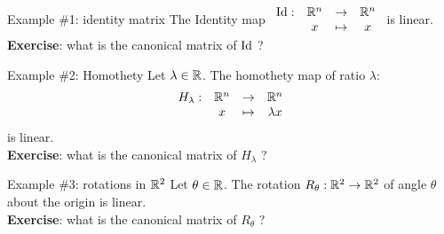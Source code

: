 \documentclass{beamer}
\begin{document}
\begin{frame}[t]{Example \#1: identity matrix}
		The Identity map \quad $\displaystyle
			\begin{array}{cccc}
				{{\rm Id}}: & \mathbb{R}^n & \to & \mathbb{R}^n \\
				   & x & \mapsto & x
			\end{array}
			$
			\quad is linear.
			\\
			\vspace{0.3cm}
			\textbf{Exercise}: what is the canonical matrix of ${{\rm Id}}$ ?
\end{frame}
\begin{frame}[t]{Example \#2: Homothety}
	Let $\lambda \in \mathbb{R}$.
		The homothety map of ratio $\lambda$: 
		 $$
			\begin{array}{cccc}
				H_{\lambda}: & \mathbb{R}^n & \to & \mathbb{R}^n \\
				   & x & \mapsto & \lambda x
			\end{array}
			$$
			is linear.
			\\
			\vspace{0.3cm}
			\textbf{Exercise}: what is the canonical matrix of $H_{\lambda}$ ?
\end{frame}
\begin{frame}[t]{Example \#3: rotations in $\mathbb{R}^2$}
	Let $\theta \in \mathbb{R}$.
	The rotation $R_{\theta}: \mathbb{R}^2 \to \mathbb{R}^2$ of angle $\theta$ about the origin is linear.
			\\
			\vspace{0.3cm}
			\textbf{Exercise}: what is the canonical matrix of $R_{\theta}$ ?
\end{frame}
\end{document}
